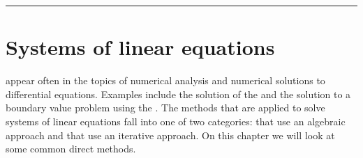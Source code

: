 \documentclass[letterpaper,10pt,english]{jupyterBook}
\begin{document}
\bigskip\hrule\bigskip



\section{Systems of linear equations}
\label{\detokenize{6_Direct_methods/6.0_Direct_methods:systems-of-linear-equations}}\label{\detokenize{6_Direct_methods/6.0_Direct_methods:systems-of-linear-equations-section}}
\sphinxAtStartPar
{} appear often in the topics of numerical analysis and numerical solutions to differential equations. Examples include the solution of the {\hyperref[\detokenize{3_IRKs/3.2_Solving_IVPs_using_IRK_methods:solving-ivps-using-irk-methods-section}]{}} and the solution to a boundary value problem using the {\hyperref[\detokenize{5_BVPs/5.2_Finite_difference_method:finite-difference-method-section}]{}}. The methods that are applied to solve systems of linear equations fall into one of two categories:  that use an algebraic approach and {\hyperref[\detokenize{7_Indirect_methods/7.0_Indirect_methods:indirect-methods-chapter}]{}} that use an iterative approach. On this chapter we will look at some common direct methods.
\end{document}

